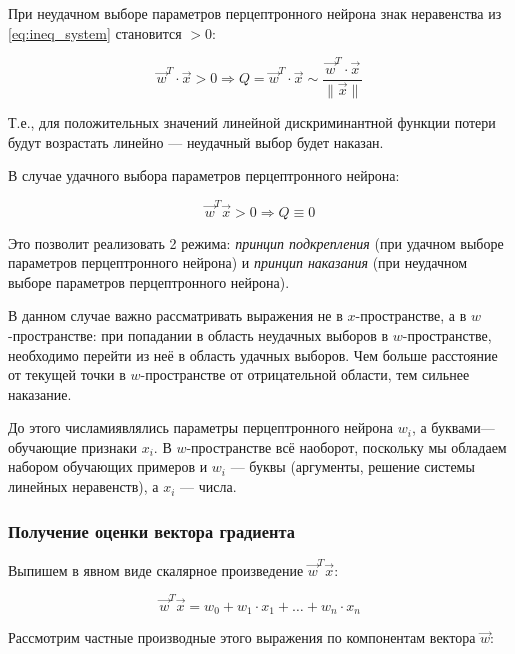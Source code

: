 \documentclass{article}
\numberwithin{equation}{subsection}
\begin{document}
При неудачном выборе параметров перцептронного нейрона знак неравенства 
из \ref{eq:ineq_system} становится $>0$:

\begin{equation}
    \vec{w}^T \cdot \vec{x} >0 \Rightarrow Q = \vec{w}^T \cdot \vec{x} \sim \dfrac{\vec{w}^T \cdot \vec{x}}{\| \vec{x} \|}
\end{equation}

Т.е., для положительных значений линейной дискриминантной функции потери будут
возрастать линейно --- неудачный выбор будет \glqq наказан\grqq.

В случае удачного выбора параметров перцептронного нейрона:

\begin{equation}
    \vec{w}^T \vec{x} >0 \Rightarrow Q \equiv 0
\end{equation}

Это позволит реализовать 2 режима: \textit{принцип подкрепления} (при удачном
выборе параметров перцептронного нейрона) и \textit{принцип наказания} 
(при неудачном выборе параметров перцептронного нейрона).

В данном случае важно рассматривать выражения не в $x$-пространстве, 
а в $w$-пространстве: при попадании в область неудачных выборов в $w$-пространстве,
необходимо перейти из неё в область удачных выборов. Чем больше расстояние от текущей
точки в $w$-пространстве от отрицательной области, тем сильнее \glqq наказание\grqq.

До этого \glqq числами\grqq являлись параметры перцептронного нейрона $w_i$, а 
\glqq буквами\grqq --- обучающие признаки $x_i$. В $w$-пространстве всё наоборот,
поскольку мы обладаем набором обучающих примеров и $w_i$ --- \glqq буквы\grqq
(аргументы, решение системы линейных неравенств), а $x_i$ --- \glqq числа\grqq.





\subsubsection{Получение оценки вектора градиента}

Выпишем в явном виде скалярное произведение $\vec{w}^T \vec{x}$:

\begin{equation}
    \vec{w}^T \vec{x} = w_0 + w_1 \cdot x_1 + \dots + w_n \cdot x_n
\end{equation}

Рассмотрим частные производные этого выражения по компонентам вектора $\vec{w}$:
\end{document}
